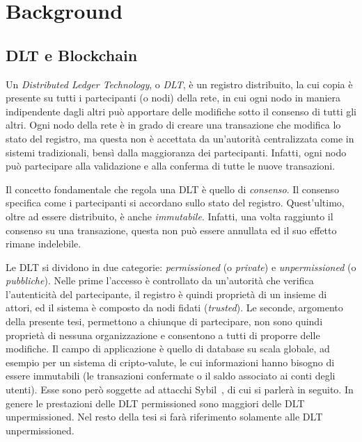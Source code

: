 \chapter{Background}

\section{DLT e Blockchain}\label{sec:blockchain}

Un \emph{Distributed Ledger Technology}, o \emph{DLT}, è un registro distribuito, la cui copia è presente su tutti i partecipanti (o nodi) della rete, in cui ogni nodo in maniera indipendente dagli altri può apportare delle modifiche sotto il consenso di tutti gli altri. Ogni nodo della rete è in grado di creare una transazione che modifica lo stato del registro, ma questa non è accettata da un'autorità centralizzata come in sistemi tradizionali, bensì dalla maggioranza dei partecipanti. Infatti, ogni nodo può partecipare alla validazione e alla conferma di tutte le nuove transazioni.

Il concetto fondamentale che regola una DLT è quello di \emph{consenso}. Il consenso specifica come i partecipanti si accordano sullo stato del registro. Quest'ultimo, oltre ad essere distribuito, è anche \emph{immutabile}. Infatti, una volta raggiunto il consenso su una transazione, questa non può essere annullata ed il suo effetto rimane indelebile.

Le DLT si dividono in due categorie: \emph{permissioned} (o \emph{private}) e \emph{unpermissioned} (o \emph{pubbliche}). Nelle prime l'accesso è controllato da un'autorità che verifica l'autenticità del partecipante, il registro è quindi proprietà di un insieme di attori, ed il sistema è composto da nodi fidati (\emph{trusted}). Le seconde, argomento della presente tesi, permettono a chiunque di partecipare, non sono quindi proprietà di nessuna organizzazione e consentono a tutti di proporre delle modifiche. Il campo di applicazione è quello di database su scala globale, ad esempio per un sistema di cripto-valute, le cui informazioni hanno bisogno di essere immutabili (le transazioni confermate o il saldo associato ai conti degli utenti). Esse sono però soggette ad attacchi Sybil~\cite{douceur2002sybil}, di cui si parlerà in seguito. In genere le prestazioni delle DLT permissioned sono maggiori delle DLT unpermissioned. Nel resto della tesi si farà riferimento solamente alle DLT unpermissioned.

